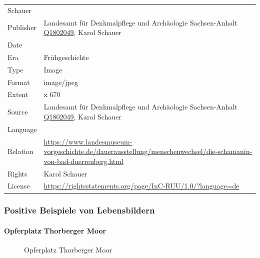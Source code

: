 \documentclass[
  letterpaper,
  DIV=11,
  numbers=noendperiod,
  landscape,
  a4paper,
  geometry:margin=1in]{scrartcl}
\let\oldparagraph\paragraph
\renewcommand{\paragraph}[1]{\oldparagraph{#1}\mbox{}}
\begin{document}
\begin{longtable}[]{@{}
  >{\raggedright\arraybackslash}p{}
  >{\raggedright\arraybackslash}p{}@{}}
Schauer \\
Publisher & Landesamt für Denkmalpflege und Archäologie Sachsen-Anhalt
\href{https://www.wikidata.org/wiki/Q1802049}{Q1802049}, Karol
Schauer \\
Date & \\
Era & Frühgeschichte \\
Type & Image \\
Format & image/jpeg \\
Extent & 551 x 670 \\
Source & Landesamt für Denkmalpflege und Archäologie Sachsen-Anhalt
\href{https://www.wikidata.org/wiki/Q1802049}{Q1802049}, Karol
Schauer \\
Language & \\
Relation &
\url{https://www.landesmuseum-vorgeschichte.de/dauerausstellung/menschenwechsel/die-schamanin-von-bad-duerrenberg.html} \\
Rights & Karol Schauer \\
License &
\url{https://rightsstatements.org/page/InC-RUU/1.0/?language=de} \\
\end{longtable}

\subsubsection{Positive Beispiele von
Lebensbildern}\label{positive-beispiele-von-lebensbildern}

\paragraph{Opferplatz Thorberger Moor}\label{opferplatz-thorberger-moor}

\begin{figure}


\caption{\label{fig-opferplatz-thorberger-moor}Opferplatz Thorberger
Moor}

\end{figure}%
\end{document}
